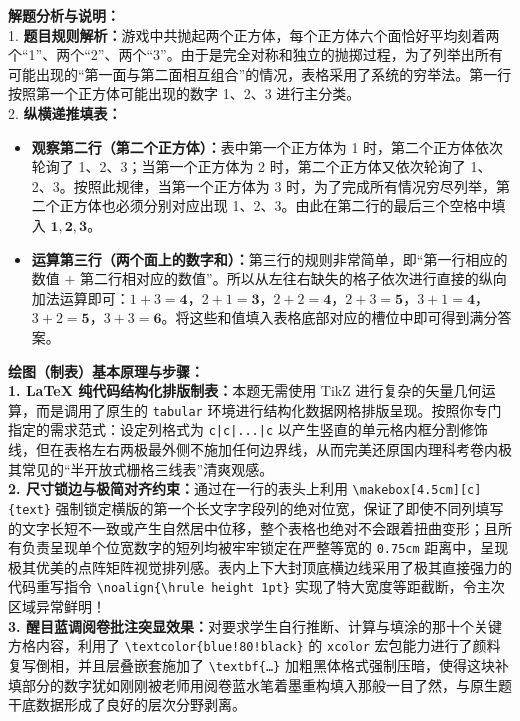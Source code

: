 {\small\color{gray}
\textbf{解题分析与说明：}\\
1. \textbf{题目规则解析：}游戏中共抛起两个正方体，每个正方体六个面恰好平均刻着两个“1”、两个“2”、两个“3”。由于是完全对称和独立的抛掷过程，为了列举出所有可能出现的“第一面与第二面相互组合”的情况，表格采用了系统的穷举法。第一行按照第一个正方体可能出现的数字 1、2、3 进行主分类。\\
2. \textbf{纵横递推填表：}
\begin{itemize}
    \item \textbf{观察第二行（第二个正方体）：}表中第一个正方体为 1 时，第二个正方体依次轮询了 1、2、3；当第一个正方体为 2 时，第二个正方体又依次轮询了 1、2、3。按照此规律，当第一个正方体为 3 时，为了完成所有情况穷尽列举，第二个正方体也必须分别对应出现 1、2、3。由此在第二行的最后三个空格中填入 $\boldsymbol{1, 2, 3}$。
    \item \textbf{运算第三行（两个面上的数字和）：}第三行的规则非常简单，即“第一行相应的数值 $+$ 第二行相对应的数值”。所以从左往右缺失的格子依次进行直接的纵向加法运算即可：$1+3=\boldsymbol{4}$，$2+1=\boldsymbol{3}$，$2+2=\boldsymbol{4}$，$2+3=\boldsymbol{5}$，$3+1=\boldsymbol{4}$，$3+2=\boldsymbol{5}$，$3+3=\boldsymbol{6}$。将这些和值填入表格底部对应的槽位中即可得到满分答案。
\end{itemize}
}

\vspace{0.6cm}

{\small\color{blue!70!black}
\textbf{绘图（制表）基本原理与步骤：}\\
\textbf{1. LaTeX 纯代码结构化排版制表：}本题无需使用 TikZ 进行复杂的矢量几何运算，而是调用了原生的 \texttt{tabular} 环境进行结构化数据网格排版呈现。按照你专门指定的需求范式：设定列格式为 \texttt{c|c|...|c} 以产生竖直的单元格内框分割修饰线，但在表格左右两极最外侧不施加任何边界线，从而完美还原国内理科考卷内极其常见的“半开放式栅格三线表”清爽观感。\\
\textbf{2. 尺寸锁边与极简对齐约束：}通过在一行的表头上利用 \texttt{\textbackslash makebox[4.5cm][c]\{text\}} 强制锁定横版的第一个长文字字段列的绝对位宽，保证了即使不同列填写的文字长短不一致或产生自然居中位移，整个表格也绝对不会跟着扭曲变形；且所有负责呈现单个位宽数字的短列均被牢牢锁定在严整等宽的 \texttt{0.75cm} 距离中，呈现极其优美的点阵矩阵视觉排列感。表内上下大封顶底横边线采用了极其直接强力的代码重写指令 \texttt{\textbackslash noalign\{\textbackslash hrule height 1pt\}} 实现了特大宽度等距截断，令主次区域异常鲜明！\\
\textbf{3. 醒目蓝调阅卷批注突显效果：}对要求学生自行推断、计算与填涂的那十个关键方格内容，利用了 \texttt{\textbackslash textcolor\{blue!80!black\}} 的 \texttt{xcolor} 宏包能力进行了颜料复写倒相，并且层叠嵌套施加了 \texttt{\textbackslash textbf\{\dots\}} 加粗黑体格式强制压暗，使得这块补填部分的数字犹如刚刚被老师用阅卷蓝水笔着墨重构填入那般一目了然，与原生题干底数据形成了良好的层次分野剥离。
}

